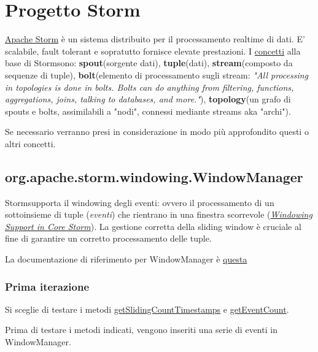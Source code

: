 \documentclass[10pt, a4paper]{article}
\def\storm{Storm}
\begin{document}
	\section{Progetto \storm}
	\href{https://storm.apache.org/}{Apache Storm} 
	è un sistema distribuito per il processamento realtime di dati. 
	E' scalabile, fault tolerant e sopratutto fornisce elevate prestazioni. 
	I \href{https://storm.apache.org/releases/current/Concepts.html}{concetti} 
	alla base di \storm\;sono: 
	\textbf{spout}(sorgente dati), 
	\textbf{tuple}(dati), 
	\textbf{stream}(composto da sequenze di tuple), 
	\textbf{bolt}(elemento di processamento sugli stream: 
		\textit{"All processing in topologies is done in bolts. Bolts can do anything from filtering, functions,
		aggregations, joins, talking to databases, and more."}),
	\textbf{topology}(un grafo di spouts e bolts, assimilabili a "nodi", connessi mediante streams aka "archi").
	
	Se necessario verranno presi in considerazione in modo più approfondito questi o altri concetti.
	
	\subsection{org.apache.storm.windowing.WindowManager}
	\storm\;supporta il windowing degli eventi: 
	ovvero il processamento di un sottoinsieme di tuple (\textit{eventi})  
	che rientrano in una finestra scorrevole 
	(\href{https://storm.apache.org/releases/1.2.3/Windowing.html}
	{\textit{Windowing Support in Core Storm}}).
	La gestione corretta della sliding window è cruciale al fine di garantire un corretto processamento
	delle tuple.
	
	La documentazione di riferimento per WindowManager è 
	\href{https://storm.apache.org/releases/2.6.2/javadocs/org/apache/storm/windowing/WindowManager.html}
	{questa}
	
	\subsubsection{Prima iterazione}
	Si sceglie di testare i metodi 
	\href{https://storm.apache.org/releases/2.6.2/javadocs/org/apache/storm/windowing/WindowManager.html#getSlidingCountTimestamps(long,long,int)}
	{getSlidingCountTimestamps} e
	\href{https://storm.apache.org/releases/2.6.2/javadocs/org/apache/storm/windowing/WindowManager.html#getEventCount(long)}
	{getEventCount}.
	
	Prima di testare i metodi indicati, vengono inseriti una serie di eventi in WindowManager.
	
\end{document}
